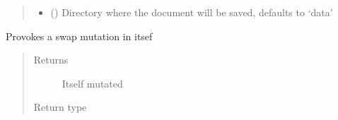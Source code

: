\documentclass[letterpaper,10pt,english]{sphinxmanual}
\begin{document}
\begin{fulllineitems}
\begin{fulllineitems}
\begin{quote}
\begin{description}
\begin{itemize}
\item {} 
\sphinxAtStartPar
{} (\sphinxstyleliteralemphasis{\sphinxupquote{, }}) \textendash{} Directory where the document will be saved, defaults to ‘data’

\end{itemize}

\end{description}\end{quote}

\end{fulllineitems}


\begin{fulllineitems}
\label{\detokenize{molecular:molecular.Molecule.swap_mutate}}
\sphinxAtStartPar
Provokes a swap mutation in itsef
\begin{quote}\begin{description}
\item[{Returns}] \leavevmode
\sphinxAtStartPar
Itself mutated

\item[{Return type}] \leavevmode
\sphinxAtStartPar
{\hyperref[\detokenize{molecular:molecular.Molecule}]{}}

\end{description}\end{quote}

\end{fulllineitems}


\end{fulllineitems}

\end{document}
